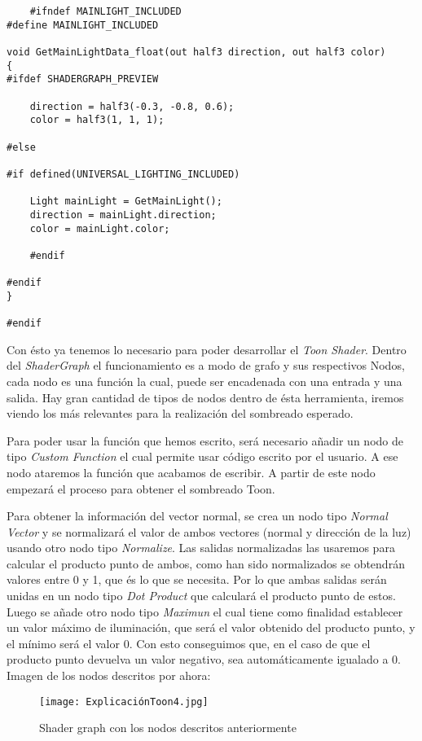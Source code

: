 \begin{lstlisting}
    #ifndef MAINLIGHT_INCLUDED
#define MAINLIGHT_INCLUDED

void GetMainLightData_float(out half3 direction, out half3 color)
{
#ifdef SHADERGRAPH_PREVIEW

    direction = half3(-0.3, -0.8, 0.6);
    color = half3(1, 1, 1);

#else

#if defined(UNIVERSAL_LIGHTING_INCLUDED)

    Light mainLight = GetMainLight();
    direction = mainLight.direction;
    color = mainLight.color;

    #endif

#endif 
}

#endif
\end{lstlisting}

Con ésto ya tenemos lo necesario para poder desarrollar el \textit{Toon Shader}. Dentro del \textit{ShaderGraph} el funcionamiento es a modo de grafo y sus respectivos Nodos, cada nodo es una función la cual, puede ser encadenada con una entrada y una salida. Hay gran cantidad de tipos de nodos dentro de ésta herramienta, iremos viendo los más relevantes para la realización del sombreado esperado.

Para poder usar la función que hemos escrito, será necesario añadir un nodo de tipo \textit{Custom Function} el cual permite usar código escrito por el usuario. A ese nodo ataremos la función que acabamos de escribir. A partir de este nodo empezará el proceso para obtener el sombreado Toon.

Para obtener la información del vector normal, se crea un nodo tipo \textit{Normal Vector} y se normalizará el valor de ambos vectores (normal y dirección de la luz) usando otro nodo tipo \textit{Normalize}. Las salidas normalizadas las usaremos para calcular el producto punto de ambos, como han sido normalizados se obtendrán valores entre 0 y 1, que és lo que se necesita. Por lo que ambas salidas serán unidas en un nodo tipo \textit{Dot Product} que calculará el producto punto de estos. Luego se añade otro nodo tipo \textit{Maximun} el cual tiene como finalidad establecer un valor máximo de iluminación, que será el valor obtenido del producto punto, y el mínimo será el valor 0. Con esto conseguimos que, en el caso de que el producto punto devuelva un valor negativo, sea automáticamente igualado a 0. Imagen de los nodos descritos por ahora: 

\begin{figure}[H]
    \centering
    \texttt{[image: ExplicaciónToon4.jpg]}
    \caption{Shader graph con los nodos descritos anteriormente}
\end{figure}

